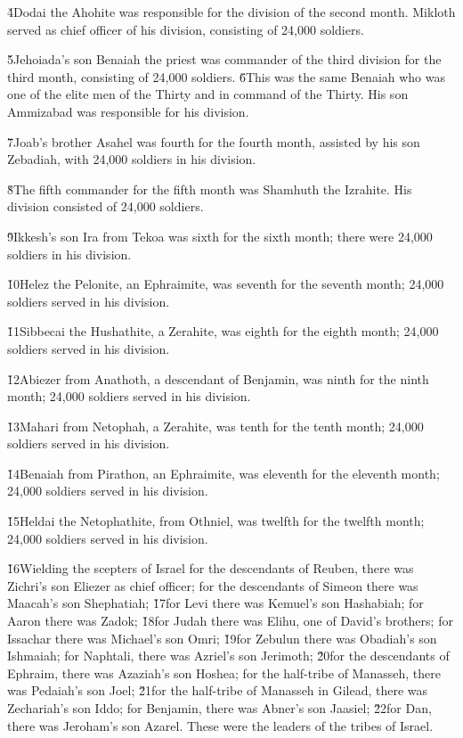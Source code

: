 \v{4}Dodai the Ahohite was responsible for the division of the second month. Mikloth served as chief officer of his division, consisting of 24,000 soldiers.

\v{5}Jehoiada's son Benaiah the priest was commander of the third division for the third month, consisting of 24,000 soldiers. \v{6}This was the same Benaiah who was one of the elite men of the Thirty and in command of the Thirty. His son Ammizabad was responsible for his division.

\v{7}Joab's brother Asahel was fourth for the fourth month, assisted by his son Zebadiah, with 24,000 soldiers in his division.

\v{8}The fifth commander for the fifth month was Shamhuth the Izrahite. His division consisted of 24,000 soldiers.

\v{9}Ikkesh's son Ira from Tekoa was sixth for the sixth month; there were 24,000 soldiers in his division.

\v{10}Helez the Pelonite, an Ephraimite, was seventh for the seventh month; 24,000 soldiers served in his division.

\v{11}Sibbecai the Hushathite, a Zerahite, was eighth for the eighth month; 24,000 soldiers served in his division.

\v{12}Abiezer from Anathoth, a descendant of Benjamin, was ninth for the ninth month; 24,000 soldiers served in his division.

\v{13}Mahari from Netophah, a Zerahite, was tenth for the tenth month; 24,000 soldiers served in his division.

\v{14}Benaiah from Pirathon, an Ephraimite, was eleventh for the eleventh month; 24,000 soldiers served in his division.

\v{15}Heldai the Netophathite, from Othniel, was twelfth for the twelfth month; 24,000 soldiers served in his division.

\v{16}Wielding the scepters of Israel for the descendants of Reuben, there was Zichri's son Eliezer as chief officer; for the descendants of Simeon there was Maacah's son Shephatiah; \v{17}for Levi there was Kemuel's son Hashabiah; for Aaron there was Zadok; \v{18}for Judah there was Elihu, one of David's brothers; for Issachar there was Michael's son Omri; \v{19}for Zebulun there was Obadiah's son Ishmaiah; for Naphtali, there was Azriel's son Jerimoth; \v{20}for the descendants of Ephraim, there was Azaziah's son Hoshea; for the half-tribe of Manasseh, there was Pedaiah's son Joel; \v{21}for the half-tribe of Manasseh in Gilead, there was Zechariah's son Iddo; for Benjamin, there was Abner's son Jaasiel; \v{22}for Dan, there was Jeroham's son Azarel. These were the leaders of the tribes of Israel.

